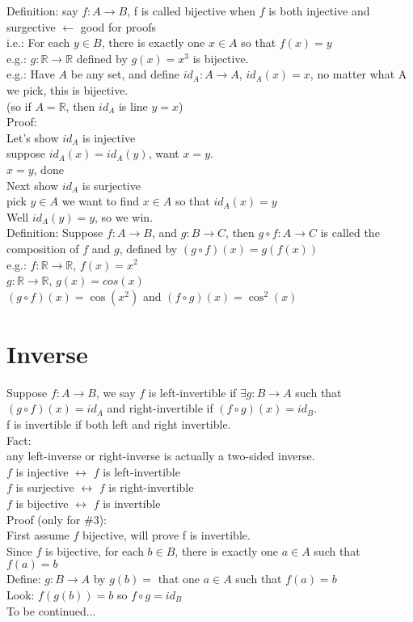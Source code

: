 \documentclass[11pt]{article}
\begin{document}
Definition: say $f:A\rightarrow B$, f is called bijective when $f$ is both injective and surgective $\leftarrow$ good for proofs\\
i.e.: For each $y\in B$, there is exactly one $x\in A$ so that $f(x)=y$\\
e.g.: $g: \mathbb{R}\rightarrow\mathbb{R}$ defined by $g(x)=x^3$ is bijective.\\
e.g.: Have $A$ be any set, and define $\mathit{id}_A: A\rightarrow A$, $\mathit{id}_A(x)=x$, no matter what A we pick, this is bijective.\\
(so if $A=\mathbb{R}$, then $\mathit{id}_A$ is line $y=x$)\\
Proof: \\
Let's show $\mathit{id}_A$ is injective\\
suppose $\mathit{id}_A(x)=\mathit{id}_A(y)$, want $x=y$.\\
$x=y$, done\\
Next show $\mathit{id}_A$ is surjective\\
pick $y\in A$ we want to find $x\in A$ so that $\mathit{id}_A(x)=y$\\
Well $\mathit{id}_A(y)=y$, so we win.\\

Definition: Suppose $f: A\rightarrow B$, and $g: B\rightarrow C$, then $g\circ f: A\rightarrow C$ is called the composition of $f$ and $g$, defined by $(g\circ f)(x) = g(f(x))$\\
e.g.: $f: \mathbb{R}\rightarrow\mathbb{R}$, $f(x)=x^2$\\
$g: \mathbb{R}\rightarrow\mathbb{R}$, $g(x)=cos(x)$\\
$(g\circ f)(x) = \cos(x^2)$ and $(f\circ g)(x) = \cos^2(x)$\\

\section{Inverse}
Suppose $f: A\rightarrow B$, we say $f$ is left-invertible if $\exists g: B\rightarrow A$ such that $(g\circ f)(x) = \mathit{id}_A$ and right-invertible if $(f\circ g)(x) = \mathit{id}_B$.\\
f is invertible if both left and right invertible.\\
Fact: \\
any left-inverse or right-inverse is actually a two-sided inverse.\\
$f$ is injective $\leftrightarrow$ $f$ is left-invertible\\
$f$ is surjective $\leftrightarrow$ $f$ is right-invertible\\
$f$ is bijective $\leftrightarrow$ $f$ is invertible\\
Proof (only for \#3):\\
First assume $f$ bijective, will prove f is invertible.\\
Since $f$ is bijective, for each $b\in B$, there is exactly one $a\in A$ such that $f(a)=b$\\
Define: $g: B\rightarrow A$ by $g(b)=$ that one $a\in A$ such that $f(a)=b$\\
Look: $f(g(b))=b$ so $f\circ g = \mathit{id}_B$\\
To be continued...
\end{document}
